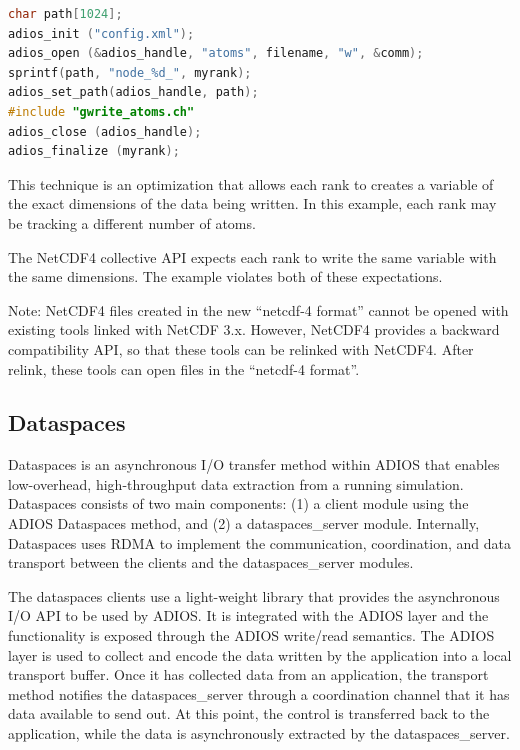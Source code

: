 \begin{lstlisting}[language=C, caption=Example C source]
char path[1024];
adios_init ("config.xml");
adios_open (&adios_handle, "atoms", filename, "w", &comm); 
sprintf(path, "node_%d_", myrank); 
adios_set_path(adios_handle, path);
#include "gwrite_atoms.ch" 
adios_close (adios_handle); 
adios_finalize (myrank);
\end{lstlisting}

This technique is an optimization that allows each rank to creates a variable of 
the exact dimensions of the data being written.  In this example, each rank may 
be tracking a different number of atoms.

The NetCDF4 collective API expects each rank to write the same variable with the 
same dimensions.  The example violates both of these expectations.

Note: NetCDF4 files created in the new ``netcdf-4 format'' cannot be opened with 
existing tools linked with NetCDF 3.x.  However, NetCDF4 provides a backward compatibility 
API, so that these tools can be relinked with NetCDF4.  After relink, these tools 
can open files in the ``netcdf-4 format''.

\subsection{Dataspaces}

Dataspaces is an asynchronous I/O transfer method within ADIOS that enables low-overhead, 
high-throughput data extraction from a running simulation. Dataspaces consists of two 
main components: (1) a client module using the ADIOS Dataspaces method, and (2)
a dataspaces\_server module. Internally, 
Dataspaces uses RDMA to implement the communication, coordination, and data transport 
between the clients and the dataspaces\_server modules.

The dataspaces clients use a light-weight library that provides the asynchronous
I/O API to be used by ADIOS. It is integrated with the ADIOS layer and the
functionality is exposed through the ADIOS write/read semantics. 
The ADIOS layer is used to collect and encode the data written 
by the application into a local transport buffer. Once it has collected data from 
an application, the transport method notifies the dataspaces\_server through a coordination channel 
that it has data available to send out. At this point, the control is
transferred back to the application, while the data is asynchronously extracted 
by the dataspaces\_server.

